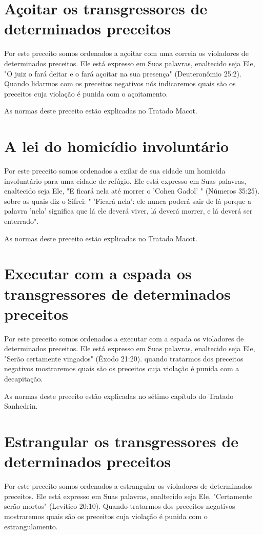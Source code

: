 \begin{itemize}
\begin{enumrate}
\begin{itemize}
\begin{itemize}
\begin{itemize}
\section{Açoitar os transgressores de determinados preceitos}

Por este preceito somos ordenados a açoitar com uma correia os
vio­ladores de determinados preceitos. Ele está expresso em Suas
palavras, enalte­cido seja Ele, "O juiz o fará deitar e o fará açoitar
na sua presença" (Deuteronô­mio 25:2). Quando lidarmos com os preceitos
negativos nós indicaremos quais são os preceitos cuja violação é punida
com o açoitamento.

As normas deste preceito estão explicadas no Tratado Macot.

\section{A lei do homicídio involuntário}

Por este preceito somos ordenados a exilar de sua cidade um homi­cida
involuntário para uma cidade de refúgio. Ele está expresso em Suas
pala­vras, enaltecido seja Ele, "E ficará nela até morrer o 'Cohen
Gadol' " (Números 35:25). sobre as quais diz o Sifrei: " 'Ficará nela':
ele nunca poderá sair de lá porque a palavra 'nela' significa que lá ele
deverá viver, lá deverá morrer, e lá deverá ser enterrado".

As normas deste preceito estão explicadas no Tratado Macot.

\section{Executar com a espada os transgressores de determinados preceitos}

Por este preceito somos ordenados a executar com a espada os vio­ladores
de determinados preceitos. Ele está expresso em Suas palavras,
enalte­cido seja Ele, "Serão certamente vingados" (Êxodo 21:20). quando
tratarmos dos preceitos negativos mostraremos quais são os preceitos
cuja violação é pu­nida com a decapitação.

As normas deste preceito estão explicadas no sétimo capítulo do Tra­tado
Sanhedrin.

\section{Estrangular os transgressores de determinados preceitos}

Por este preceito somos ordenados a estrangular os violadores de
determinados preceitos. Ele está expresso em Suas palavras, enaltecido
seja Ele, "Certamente serão mortos" (Levítico 20:10). Quando tratarmos
dos preceitos negativos mostraremos quais são os preceitos cuja violação
é punida com o estrangulamento.


\end{itemize}
\end{itemize}
\end{itemize}
\end{enumrate}
\end{itemize}

